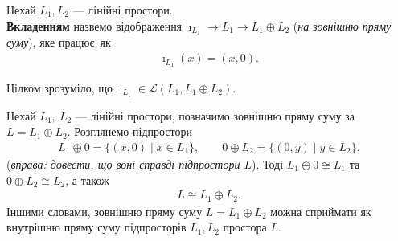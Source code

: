\documentclass{math_library}
\begin{document}
	\begin{definition}
	Нехай $L_1,L_2$ --- лінійні простори.\\
	\textbf{Вкладенням} назвемо відображення $\imath_{L_1} \to L_1 \to L_1 \oplus L_2$ (\textit{на зовнішню пряму суму}), яке працює~як
	\begin{align*}
	\imath_{L_1}(x) = (x,0).
	\end{align*}
	\end{definition}
	
	\begin{remark}
	Цілком зрозуміло, що $\imath_{L_1} \in \mathcal{L}(L_1, L_1 \oplus L_2)$.
	\end{remark}
	
	\begin{proposition}
	Нехай $L_1,\ L_2$ --- лінійні простори, позначимо зовнішню пряму суму за $L = L_1 \oplus L_2$. Розглянемо підпростори
	\begin{align*}
	L_1 \oplus 0 = \{ (x,0) \mid x \in L_1 \}, \qquad 0 \oplus L_2 = \{ (0,y) \mid y \in L_2 \}.
	\end{align*}
	(\textit{вправа: довести, що воні справді підпростори $L$}). Тоді $L_1 \oplus 0 \cong L_1$ та $0 \oplus L_2 \cong L_2$, а також
	\begin{align*}
	L \cong L_1 \oplus L_2.
	\end{align*}
	Іншими словами, зовнішню пряму суму $L = L_1 \oplus L_2$ можна сприймати як внутрішню пряму суму підпросторів $L_1, L_2$ простора $L$.
	\end{proposition}
	
\end{document}
